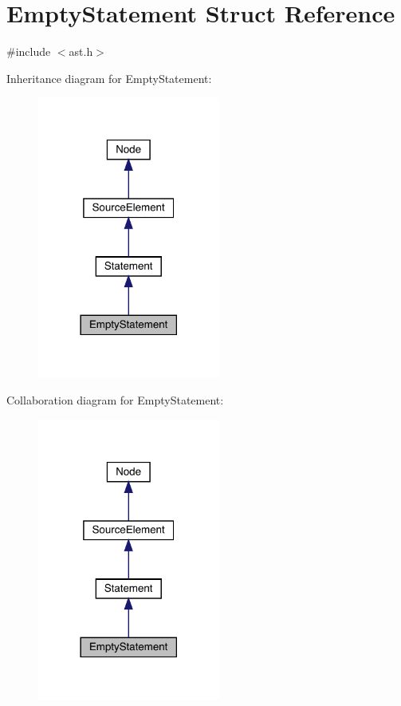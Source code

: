 \hypertarget{struct_empty_statement}{}\section{Empty\+Statement Struct Reference}
\label{struct_empty_statement}


{\ttfamily \#include $<$ast.\+h$>$}



Inheritance diagram for Empty\+Statement\+:
\nopagebreak
\begin{figure}[H]
\begin{center}
\leavevmode
\includegraphics[width=170pt]{struct_empty_statement__inherit__graph}
\end{center}
\end{figure}


Collaboration diagram for Empty\+Statement\+:
\nopagebreak
\begin{figure}[H]
\begin{center}
\leavevmode
\includegraphics[width=170pt]{struct_empty_statement__coll__graph}
\end{center}
\end{figure}
